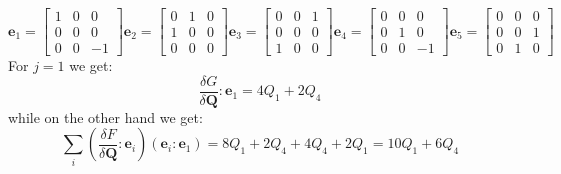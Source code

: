 \documentclass[reqno]{article}
\newcommand{\Q}{\mathbf{Q}}
\begin{document}
\begin{equation}
    \mathbf{e}_1
    =
    \begin{bmatrix}
        1 &0 &0 \\
        0 &0 &0 \\
        0 &0 &-1
    \end{bmatrix}
    \mathbf{e}_2
    =
    \begin{bmatrix}
        0 &1 &0 \\
        1 &0 &0 \\
        0 &0 &0
    \end{bmatrix}
    \mathbf{e}_3
    =
    \begin{bmatrix}
        0 &0 &1 \\
        0 &0 &0 \\
        1 &0 &0
    \end{bmatrix}
    \mathbf{e}_4
    =
    \begin{bmatrix}
        0 &0 &0 \\
        0 &1 &0 \\
        0 &0 &-1
    \end{bmatrix}
    \mathbf{e}_5
    =
    \begin{bmatrix}
        0 &0 &0 \\
        0 &0 &1 \\
        0 &1 &0
    \end{bmatrix}
\end{equation}
For $j = 1$ we get:
\begin{equation}
    \frac{\delta G}{\delta \Q} : \mathbf{e}_1
    =
    4 Q_1 + 2 Q_4
\end{equation}
while on the other hand we get:
\begin{equation}
    \sum_i \left( \frac{\delta F}{\delta \Q} : \mathbf{e}_i \right) \left( \mathbf{e}_i : \mathbf{e}_1 \right)
    =
    8 Q_1 + 2 Q_4
    +
    4 Q_4 + 2 Q_1
    =
    10 Q_1 + 6 Q_4
\end{equation}
\end{document}
